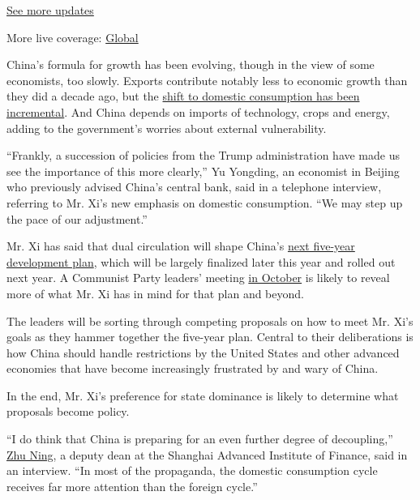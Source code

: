 \href{https://www.nytimes3xbfgragh.onion/live/2020/09/08/business/stock-market-today-coronavirus?action=click\&pgtype=Article\&state=default\&region=MAIN_CONTENT_1\&context=storylines_live_updates}{See
more updates}

More live coverage:
\href{https://www.nytimes3xbfgragh.onion/2020/09/08/world/covid-19-coronavirus.html?action=click\&pgtype=Article\&state=default\&region=MAIN_CONTENT_1\&context=storylines_live_updates}{Global}

China's formula for growth has been evolving, though in the view of some
economists, too slowly. Exports contribute notably less to economic
growth than they did a decade ago, but the
\href{https://www.imf.org/en/Publications/WP/Issues/2018/11/12/Chinas-Rebalancing-Recent-Progress-Prospects-and-Policies-46291}{shift
to domestic consumption has been incremental}. And China depends on
imports of technology, crops and energy, adding to the government's
worries about external vulnerability.

``Frankly, a succession of policies from the Trump administration have
made us see the importance of this more clearly,'' Yu Yongding, an
economist in Beijing who previously advised China's central bank, said
in a telephone interview, referring to Mr. Xi's new emphasis on domestic
consumption. ``We may step up the pace of our adjustment.''

Mr. Xi has said that dual circulation will shape China's
\href{http://www.xinhuanet.com/english/2020-08/27/c_139320265.htm}{next
five-year development plan}, which will be largely finalized later this
year and rolled out next year. A Communist Party leaders' meeting
\href{http://www.xinhuanet.com/english/2020-07/31/c_139252599.htm}{in
October} is likely to reveal more of what Mr. Xi has in mind for that
plan and beyond.

The leaders will be sorting through competing proposals on how to meet
Mr. Xi's goals as they hammer together the five-year plan. Central to
their deliberations is how China should handle restrictions by the
United States and other advanced economies that have become increasingly
frustrated by and wary of China.

In the end, Mr. Xi's preference for state dominance is likely to
determine what proposals become policy.

``I do think that China is preparing for an even further degree of
decoupling,''
\href{http://en.saif.sjtu.edu.cn/faculty-research/zhu-ning}{Zhu Ning}, a
deputy dean at the Shanghai Advanced Institute of Finance, said in an
interview. ``In most of the propaganda, the domestic consumption cycle
receives far more attention than the foreign cycle.''

